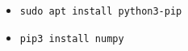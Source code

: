 

\begin{itemize}
\item \verb|sudo apt install python3-pip|
\item \verb|pip3 install numpy|
\end{itemize}

